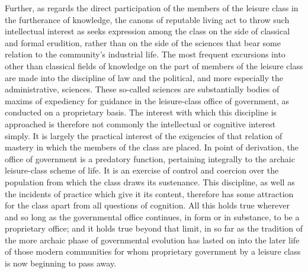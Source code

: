 \documentclass[12pt]{report}
\begin{document}
Further, as regards the direct participation of the members of the
leisure class in the furtherance of knowledge, the canons of reputable
living act to throw such intellectual interest as seeks expression among
the class on the side of classical and formal erudition, rather than
on the side of the sciences that bear some relation to the community's
industrial life. The most frequent excursions into other than classical
fields of knowledge on the part of members of the leisure class are made
into the discipline of law and the political, and more especially the
administrative, sciences. These so-called sciences are substantially
bodies of maxims of expediency for guidance in the leisure-class office
of government, as conducted on a proprietary basis. The interest with
which this discipline is approached is therefore not commonly the
intellectual or cognitive interest simply. It is largely the practical
interest of the exigencies of that relation of mastery in which the
members of the class are placed. In point of derivation, the office of
government is a predatory function, pertaining integrally to the archaic
leisure-class scheme of life. It is an exercise of control and coercion
over the population from which the class draws its sustenance. This
discipline, as well as the incidents of practice which give it its
content, therefore has some attraction for the class apart from all
questions of cognition. All this holds true wherever and so long as
the governmental office continues, in form or in substance, to be a
proprietary office; and it holds true beyond that limit, in so far as
the tradition of the more archaic phase of governmental evolution has
lasted on into the later life of those modern communities for whom
proprietary government by a leisure class is now beginning to pass away.
\end{document}
